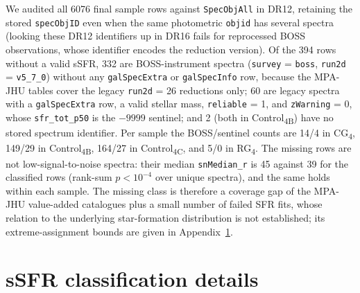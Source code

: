 \documentclass{aa}
\newcommand{\CB}{Control\textsubscript{4B}}
\newcommand{\CC}{Control\textsubscript{4C}}
\newcommand{\CG}{CG\textsubscript{4}}
\newcommand{\RG}{RG\textsubscript{4}}
\begin{document}
\begin{appendix}
We audited all 6076 final sample rows against \texttt{SpecObjAll} in DR12, retaining the stored \texttt{specObjID} even when the same photometric \texttt{objid} has several spectra (looking these DR12 identifiers up in DR16 fails for reprocessed BOSS observations, whose identifier encodes the reduction version). Of the 394 rows without a valid sSFR, 332 are BOSS-instrument spectra (\texttt{survey} = \texttt{boss}, \texttt{run2d} = \texttt{v5\_7\_0}) without any \texttt{galSpecExtra} or \texttt{galSpecInfo} row, because the MPA-JHU tables cover the legacy \texttt{run2d} = 26 reductions only; 60 are legacy spectra with a \texttt{galSpecExtra} row, a valid stellar mass, \texttt{reliable} = 1, and \texttt{zWarning} = 0, whose \texttt{sfr\_tot\_p50} is the \(-9999\) sentinel; and 2 (both in \CB{}) have no stored spectrum identifier. Per sample the BOSS/sentinel counts are 14/4 in \CG{}, 149/29 in \CB{}, 164/27 in \CC{}, and 5/0 in \RG{}. The missing rows are not low-signal-to-noise spectra: their median \texttt{snMedian\_r} is 45 against 39 for the classified rows (rank-sum \(p<10^{-4}\) over unique spectra), and the same holds within each sample. The missing class is therefore a coverage gap of the MPA-JHU value-added catalogues plus a small number of failed SFR fits, whose relation to the underlying star-formation distribution is not established; its extreme-assignment bounds are given in Appendix~\ref{app:ssfr_method}.


\section{sSFR classification details}\label{app:ssfr_method}


\end{appendix}
\end{document}
